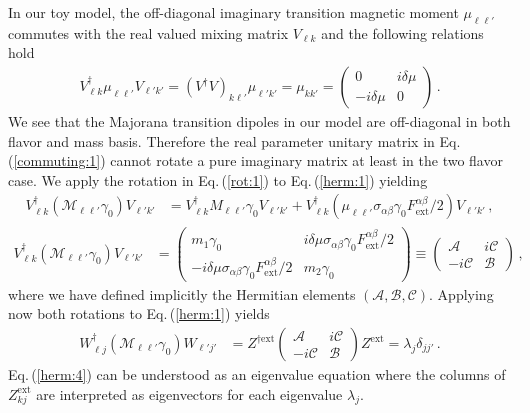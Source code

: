 \documentclass{ws-ijmpa}
\newcommand{\req}[1]{Eq.\,(\ref{#1})}
\begin{document}
In our toy model, the off-diagonal imaginary transition magnetic moment  $\mu_{\ell\ell'}$ commutes with the real valued mixing matrix $V_{\ell k}$ and the following relations hold
\begin{align}
\label{commuting:1}
V_{\ell k}^{\dag}\mu_{\ell\ell'}V_{\ell' k'}=(V^{\dag}V)_{k\ell'}\mu_{\ell'k'}=\mu_{kk'}=
\begin{pmatrix}
0 & i\delta\mu\\
-i\delta\mu & 0
\end{pmatrix}\,.
\end{align}
We see that the Majorana transition dipoles in our model are off-diagonal in both flavor and mass basis. Therefore the real parameter unitary matrix in \req{commuting:1} cannot rotate a pure imaginary matrix at least in the two flavor case. We apply the rotation in \req{rot:1} to \req{herm:1} yielding
\begin{align}
\label{herm:2}
V_{\ell k}^{\dag}(\mathcal{M}_{\ell\ell'}\gamma_{0})V_{\ell' k'} &= 
V_{\ell k}^{\dag}M_{\ell\ell'}\gamma_{0}V_{\ell' k'} +
V_{\ell k}^{\dag}(\mu_{\ell\ell'}\sigma_{\alpha\beta}\gamma_{0}F^{\alpha\beta}_\mathrm{ext}/2)V_{\ell' k'}\,,
\end{align}
%
\begin{align}
\label{herm:3}
V_{\ell k}^{\dag}(\mathcal{M}_{\ell\ell'}\gamma_{0})V_{\ell' k'} &= 
\begin{pmatrix}
m_{1}\gamma_{0} & i\delta\mu\sigma_{\alpha\beta}\gamma_{0}F^{\alpha\beta}_\mathrm{ext}/2\\
-i\delta\mu\sigma_{\alpha\beta}\gamma_{0}F^{\alpha\beta}_\mathrm{ext}/2 & m_{2}\gamma_{0}
\end{pmatrix}\equiv
\begin{pmatrix}
\mathcal{A} & i\mathcal{C}\\
-i\mathcal{C} & \mathcal{B}
\end{pmatrix}\,,
\end{align}
where we have defined implicitly the Hermitian elements $(\mathcal{A},\mathcal{B},\mathcal{C})$.  Applying now both rotations 
to \req{herm:1} yields
\begin{align}
\label{herm:4}
W_{\ell j}^{\dag}(\mathcal{M}_{\ell\ell'}\gamma_{0})W_{\ell' j'} &= 
Z^{\dag\mathrm{ext}}\begin{pmatrix}
\mathcal{A} & i\mathcal{C}\\
-i\mathcal{C} & \mathcal{B}
\end{pmatrix}Z^\mathrm{ext}=\lambda_{j}\delta_{jj'}\,.
\end{align}
\req{herm:4} can be understood as an eigenvalue equation where the columns of $Z_{kj}^\mathrm{ext}$ are interpreted as eigenvectors for each eigenvalue $\lambda_{j}$.
\end{document}
